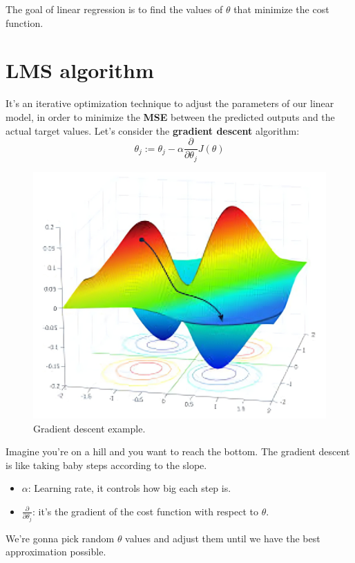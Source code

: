 \documentclass{book}
\begin{document}
The goal of linear regression is to find the values of $\theta$ that minimize the cost function.

\section{LMS algorithm}
It's an iterative optimization technique to adjust the parameters of our linear model, in order to minimize the \textbf{MSE} between the predicted outputs and the actual target values. Let's consider the \textbf{gradient descent} algorithm:
\[
\theta_j := \theta_j - \alpha \frac{\partial}{\partial \theta_j} J(\theta)
\]

\begin{figure}[ht]
    \centering
    \includegraphics[width=\linewidth]{../assets/gradient-descent.png}
    \caption{Gradient descent example.}
\end{figure}

Imagine you're on a hill and you want to reach the bottom. The gradient descent is like taking baby steps according to the slope.

\begin{itemize}
    \item $\alpha$: Learning rate, it controls how big each step is.
    \item $\frac{\partial}{\partial \theta_j}$: it's the gradient of the cost function with respect to $\theta$.
\end{itemize}

We're gonna pick random $\theta$ values and adjust them until we have the best approximation possible.
\end{document}
